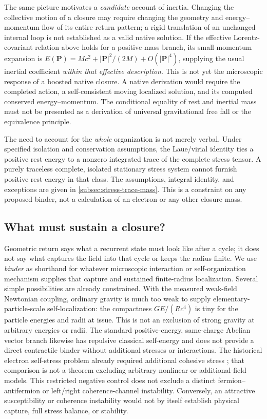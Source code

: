 \documentclass[11pt]{article}
\theoremstyle{definition}
\begin{document}
The same picture motivates a \emph{candidate} account of inertia.  Changing
the collective motion of a closure may require changing the geometry and
energy--momentum flow of its entire return pattern; a rigid translation of an
unchanged internal loop is not established as a valid native solution.  If
the effective Lorentz-covariant relation above holds for a positive-mass
branch, its small-momentum expansion is
$E(\mathbf P)=Mc^2+|\mathbf P|^2/(2M)+O(|\mathbf P|^4)$, supplying the
usual inertial coefficient \emph{within that effective description}.
This is not yet the microscopic response of a boosted native closure.
A native derivation would require the completed action, a self-consistent
moving localized solution, and its computed conserved energy--momentum.
The conditional equality of rest and inertial mass must not be presented as
a derivation of universal gravitational free fall or the equivalence principle.

The need to account for the \emph{whole} organization is not merely verbal.
Under specified isolation and conservation assumptions, the Laue/virial
identity \cite{Laue1911Dynamik,Giulini2018LaueRevisited} ties a positive rest energy to a nonzero integrated trace of the
complete stress tensor.  A purely traceless complete, isolated stationary
stress system cannot furnish positive rest energy in that class.  The
assumptions, integral identity, and exceptions are given in
\cref{subsec:stress-trace-mass}.  This is a constraint on any proposed binder,
not a calculation of an electron or any other closure mass.


\subsection{What must sustain a closure?}
\label{subsec:binder}

Geometric return says what a recurrent state must look like after a cycle; it does not say
what captures the field into that cycle or keeps the radius finite.  We use
\emph{binder} as shorthand for whatever microscopic interaction or self-organization
mechanism supplies that capture and sustained finite-radius localization.  Several simple
possibilities are already constrained.  With the measured weak-field Newtonian
coupling, ordinary gravity is much too weak to supply elementary-particle-scale
self-localization: the compactness $GE/(Rc^4)$ is tiny for the particle energies
and radii at issue.  This is not an exclusion of strong gravity at arbitrary
energies or radii.  The standard positive-energy, same-charge Abelian vector
branch likewise has repulsive classical self-energy and does not provide a
direct contractile binder without additional stresses or interactions.
The historical electron self-stress problem already required additional
cohesive stress \cite{Poincare1906Electron}; that comparison is not a theorem
excluding arbitrary nonlinear or additional-field models.  This restricted negative control
does not exclude a distinct fermion--antifermion or left/right coherence-channel
instability.  Conversely, an attractive susceptibility or coherence instability
would not by itself establish physical capture, full stress balance, or stability.
\end{document}
